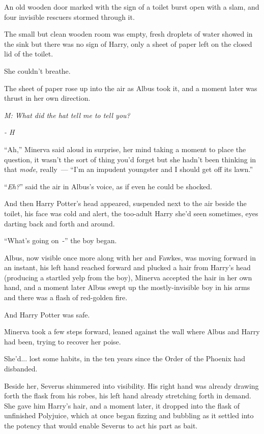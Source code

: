 An old wooden door marked with the sign of a toilet burst open with a slam, and four invisible rescuers stormed through it.

The small but clean wooden room was empty, fresh droplets of water showed in the sink but there was no sign of Harry, only a sheet of paper left on the closed lid of the toilet.

She couldn't breathe.

The sheet of paper rose up into the air as Albus took it, and a moment later was thrust in her own direction.

\emph{M: What did the hat tell me to tell you?}

\emph{- H}

``Ah,'' Minerva said aloud in surprise, her mind taking a moment to place the question, it wasn't the sort of thing you'd forget but she hadn't been thinking in that \emph{mode,} really~--- ``I'm an impudent youngster and I should get off its lawn.''

``\emph{Eh?}'' said the air in Albus's voice, as if even he could be shocked.

And then Harry Potter's head appeared, suspended next to the air beside the toilet, his face was cold and alert, the too-adult Harry she'd seen sometimes, eyes darting back and forth and around.

``What's going on~-'' the boy began.

Albus, now visible once more along with her and Fawkes, was moving forward in an instant, his left hand reached forward and plucked a hair from Harry's head (producing a startled yelp from the boy), Minerva accepted the hair in her own hand, and a moment later Albus swept up the mostly-invisible boy in his arms and there was a flash of red-golden fire.

And Harry Potter was safe.

Minerva took a few steps forward, leaned against the wall where Albus and Harry had been, trying to recover her poise.

She'd... lost some habits, in the ten years since the Order of the Phoenix had disbanded.

Beside her, Severus shimmered into visibility. His right hand was already drawing forth the flask from his robes, his left hand already stretching forth in demand. She gave him Harry's hair, and a moment later, it dropped into the flask of unfinished Polyjuice, which at once began fizzing and bubbling as it settled into the potency that would enable Severus to act his part as bait.

